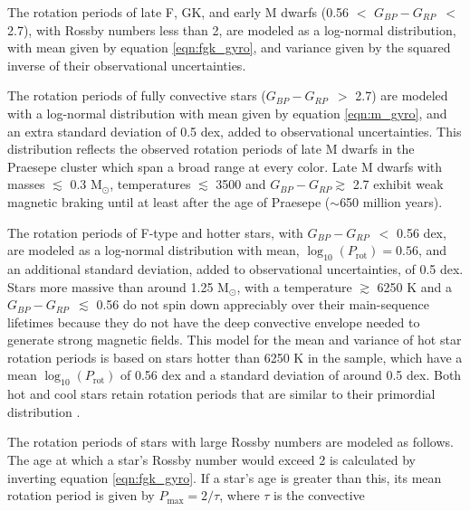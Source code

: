 \documentclass[useAMS, usenatbib, preprint, 12pt]{aastex}
\newcommand{\eg}{{\it e.g.}}
\newcommand{\gcolor}{$G_{BP} - G_{RP}$}
\begin{document}
\begin{itemize}
    \item{The rotation periods of late F, GK, and early M dwarfs
        (0.56 $<$ \gcolor\ $<$ 2.7), with Rossby numbers less than 2, are
        modeled as a log-normal distribution, with mean given by equation
        \ref{eqn:fgk_gyro}, and variance given by the squared inverse of their
        observational uncertainties.}
    \item{The rotation periods of fully convective stars (\gcolor\ $>$ 2.7)
        are modeled with a log-normal distribution with mean given by equation
        \ref{eqn:m_gyro}, and an extra standard deviation of
        0.5 dex, added to observational uncertainties.
        This distribution reflects the observed rotation periods of late M
        dwarfs in the Praesepe cluster which span a broad range at every
        color.
        Late M dwarfs with masses $\lesssim$ 0.3 M$_\odot$, temperatures
        $\lesssim$ 3500 and \gcolor $\gtrsim$ 2.7 exhibit weak magnetic
        braking until at least after the age of Praesepe ($\sim$650 million
        years).
    \item{The rotation periods of F-type and hotter stars, with \gcolor\ $<$
        0.56 dex, are modeled as a log-normal distribution with mean,
        $\log_{10}(P_\mathrm{rot})=0.56$,
        and an additional standard deviation, added to observational
        uncertainties, of 0.5 dex.
        Stars more massive than around 1.25 M$_\odot$, with a temperature
        $\gtrsim$ 6250 K and a \gcolor\ $\lesssim$ 0.56 do not spin down
        appreciably over their main-sequence lifetimes because they do not
        have the deep convective envelope needed to generate strong magnetic
        fields.
        This model for the mean and variance of hot star rotation periods is
        based on stars hotter than 6250 K in the \citet{mcquillan2014} sample,
        which have a mean $\log_{10}(P_\mathrm{rot})$ of 0.56 dex and a
        standard deviation of around 0.5 dex.}
        Both hot and cool stars retain rotation periods that are similar to
        their primordial distribution \citep[see \eg][]{matt2012,
        somers2017}.}
    \item{The rotation periods of stars with large Rossby numbers are
        modeled as follows.
        The age at which a star's Rossby number would exceed 2 is calculated
        by inverting equation \ref{eqn:fgk_gyro}.
        If a star's age is greater than this, its mean rotation period is
        given by $P_\mathrm{max} = 2/\tau$, where $\tau$ is the convective
}
\end{itemize}
\end{document}
